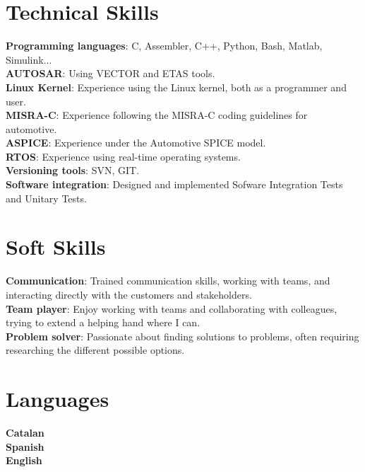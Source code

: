 \documentclass[letterpaper,11pt]{article}
\begin{document}
%
\section{Technical Skills}
 \begin{itemize}[leftmargin=0.15in, label={}]
    \small{\item{
     \textbf{Programming languages}{: C, Assembler, C++, Python, Bash, Matlab, Simulink...} \\
     \textbf{AUTOSAR}{: Using VECTOR and ETAS tools.} \\
     \textbf{Linux Kernel}{: Experience using the Linux kernel, both as a programmer and user.} \\
     \textbf{MISRA-C}{: Experience following the MISRA-C coding guidelines for automotive. } \\
     \textbf{ASPICE}{: Experience under the Automotive SPICE model. } \\
     \textbf{RTOS}{: Experience using real-time operating systems.} \\
     \textbf{Versioning tools}{: SVN, GIT.} \\
     \textbf{Software integration}{: Designed and implemented Sofware Integration Tests and Unitary Tests.} \\
    }}
 \end{itemize}

\section{Soft Skills}
 \begin{itemize}[leftmargin=0.15in, label={}]
    \small{\item{
     \textbf{Communication}{: Trained communication skills, working with teams, and interacting directly with the customers and stakeholders. } \\
     \textbf{Team player}{: Enjoy working with teams and collaborating with colleagues, trying to extend a helping hand where I can.} \\
     \textbf{Problem solver}{: Passionate about finding solutions to problems, often requiring researching the different possible options.} \\
    }}
 \end{itemize}

\section{Languages}
 \begin{itemize}[leftmargin=0.15in, label={}]
    \small{\item{
     \textbf{Catalan}{ } \\
     \textbf{Spanish}{ } \\
     \textbf{English}{ } \\
    }}
 \end{itemize}


\end{document}
